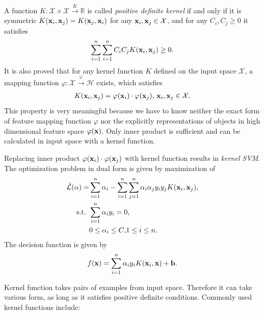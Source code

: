 \documentclass[english]{tktltiki}
\newcommand{\Hcal}{\mathcal{H}} %
\newcommand{\Xcal}{\mathcal{X}} %
\newcommand{\Lcal}{\mathcal{L}}
\newcommand{\xb}{{\bf x}}
\newcommand{\bb}{{\bf b}}
\newcommand{\valpha}{\mathbf{\alpha}}
\begin{document}
A function $K:\Xcal \times \Xcal \xrightarrow{K} \mathbb{R}$ is called {\em positive definite kernel} if and only if it is symmetric $K(\xb_i,\xb_j) = K(\xb_j,\xb_i)$ for any $\xb_i,\xb_j \in \Xcal$, and for any $C_i,C_j \ge 0$ it satisfies
\begin{align*}
\sum_{i=1}^{n}\sum_{i=1}^{n}{C_i C_j K(\xb_i, \xb_j)} \ge 0 \text{.}
\end{align*}
It is also proved \cite{taylor04} that for any kernel function $K$ defined on the input space $\Xcal$, a mapping function $\varphi: \Xcal \xrightarrow{\varphi} \Hcal$ exists, which satisfies
\begin{align*}
K(\xb_i, \xb_j) = \varphi(\xb_i) \cdot \varphi(\xb_j) \text{, } \xb_i, \xb_j \in \Xcal \text{.}
\end{align*}
This property is very meaningful because we have to know neither the exact form of feature mapping function $\varphi$ nor the explicitly representations of objects in high dimensional feature space $\varphi(\xb)$. Only inner product is sufficient and can be calculated in input space with a kernel function.

Replacing inner product $\varphi(\xb_i) \cdot \varphi(\xb_j)$ with kernel function results in {\em kernel SVM}. The optimization problem in dual form is given by maximization of
\begin{align}
\tilde{\Lcal}(\valpha) = &\sum_{i=1}^{n}{\alpha_i} - \sum_{i = 1}^{n}\sum_{j = 1}^{n}{\alpha_i \alpha_j y_i y_j K(\xb_i, \xb_j)} \text{,} \label{kernel_dual} \\
\text{ s.t. } & \sum_{i = 1}^{n}{\alpha_i y_i} = 0 \text{,} \nonumber \\
 & 0 \leq \alpha_i \leq C \text{,} 1 \leq i \leq n \text{.} \nonumber
\end{align}
The decision function is given by
\begin{align}
f(\xb) = \sum_{i = 1}^{n}{\alpha_i y_i K(\xb_i, \xb)} + \bb \text{.}
\label{kernel_decision}
\end{align}


Kernel function takes pairs of examples from input space. Therefore it can take various form, as long as it satisfies positive definite conditions. Commonly used kernel functions include:
\end{document}
